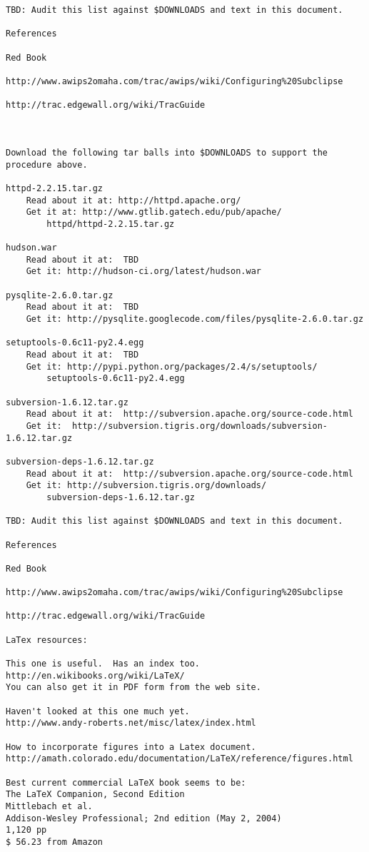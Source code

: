 \begin{verbatim}
TBD: Audit this list against $DOWNLOADS and text in this document.

References

Red Book

http://www.awips2omaha.com/trac/awips/wiki/Configuring%20Subclipse

http://trac.edgewall.org/wiki/TracGuide



Download the following tar balls into $DOWNLOADS to support the 
procedure above.

httpd-2.2.15.tar.gz
    Read about it at: http://httpd.apache.org/
    Get it at: http://www.gtlib.gatech.edu/pub/apache/
        httpd/httpd-2.2.15.tar.gz

hudson.war
    Read about it at:  TBD
    Get it: http://hudson-ci.org/latest/hudson.war

pysqlite-2.6.0.tar.gz
    Read about it at:  TBD
    Get it: http://pysqlite.googlecode.com/files/pysqlite-2.6.0.tar.gz

setuptools-0.6c11-py2.4.egg
    Read about it at:  TBD
    Get it: http://pypi.python.org/packages/2.4/s/setuptools/
        setuptools-0.6c11-py2.4.egg
    
subversion-1.6.12.tar.gz
    Read about it at:  http://subversion.apache.org/source-code.html
    Get it:  http://subversion.tigris.org/downloads/subversion-1.6.12.tar.gz

subversion-deps-1.6.12.tar.gz
    Read about it at:  http://subversion.apache.org/source-code.html
    Get it: http://subversion.tigris.org/downloads/
        subversion-deps-1.6.12.tar.gz

TBD: Audit this list against $DOWNLOADS and text in this document.

References

Red Book

http://www.awips2omaha.com/trac/awips/wiki/Configuring%20Subclipse

http://trac.edgewall.org/wiki/TracGuide

LaTex resources:

This one is useful.  Has an index too.
http://en.wikibooks.org/wiki/LaTeX/
You can also get it in PDF form from the web site.

Haven't looked at this one much yet.
http://www.andy-roberts.net/misc/latex/index.html

How to incorporate figures into a Latex document.
http://amath.colorado.edu/documentation/LaTeX/reference/figures.html

Best current commercial LaTeX book seems to be:
The LaTeX Companion, Second Edition
Mittlebach et al.
Addison-Wesley Professional; 2nd edition (May 2, 2004)
1,120 pp
$ 56.23 from Amazon


\end{verbatim}

